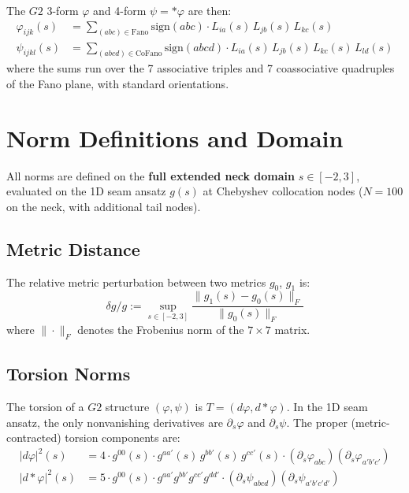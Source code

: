\documentclass[11pt,a4paper]{article}
\newcommand{\Gtwo}{\mathrm{G}_2}
\newcommand{\norm}[1]{\|#1\|}
\theoremstyle{remark}
\def\Gtwo{G2}%
\begin{document}
The $\Gtwo$ 3-form $\varphi$ and 4-form $\psi = {*}\varphi$ are then:
\begin{align}
\varphi_{ijk}(s) &= \sum_{(abc) \in \text{Fano}} \mathrm{sign}(abc) \cdot L_{ia}(s)\, L_{jb}(s)\, L_{kc}(s) \label{eq:phi_fano}\\
\psi_{ijkl}(s) &= \sum_{(abcd) \in \text{CoFano}} \mathrm{sign}(abcd) \cdot L_{ia}(s)\, L_{jb}(s)\, L_{kc}(s)\, L_{ld}(s) \label{eq:psi_fano}
\end{align}
where the sums run over the 7 associative triples and 7 coassociative quadruples of
the Fano plane, with standard orientations.

\section{Norm Definitions and Domain}\label{sec:norms}

All norms are defined on the \textbf{full extended neck domain} $s \in [-2, 3]$, evaluated on
the 1D seam ansatz $g(s)$ at Chebyshev collocation nodes ($N = 100$ on the neck, with
additional tail nodes).

\subsection{Metric Distance}\label{sec:metric_dist}

The relative metric perturbation between two metrics $g_0$, $g_1$ is:
\begin{equation}\label{eq:metric_dist}
\delta g / g := \sup_{s \in [-2,3]} \frac{\norm{g_1(s) - g_0(s)}_F}{\norm{g_0(s)}_F}
\end{equation}
where $\norm{\cdot}_F$ denotes the Frobenius norm of the $7 \times 7$ matrix.

\subsection{Torsion Norms}\label{sec:torsion_norms}

The torsion of a $\Gtwo$ structure $(\varphi, \psi)$ is $T = (d\varphi, d{*}\varphi)$. In the 1D seam ansatz, the
only nonvanishing derivatives are $\partial_s \varphi$ and $\partial_s \psi$. The proper (metric-contracted)
torsion components are:
\begin{align}
|d\varphi|^2(s) &= 4 \cdot g^{00}(s) \cdot g^{aa'}(s)\, g^{bb'}(s)\, g^{cc'}(s) \cdot (\partial_s \varphi_{abc})(\partial_s \varphi_{a'b'c'}) \label{eq:dphi}\\
|d{*}\varphi|^2(s) &= 5 \cdot g^{00}(s) \cdot g^{aa'} g^{bb'} g^{cc'} g^{dd'} \cdot (\partial_s \psi_{abcd})(\partial_s \psi_{a'b'c'd'}) \label{eq:dstarphi}
\end{align}
\end{document}
